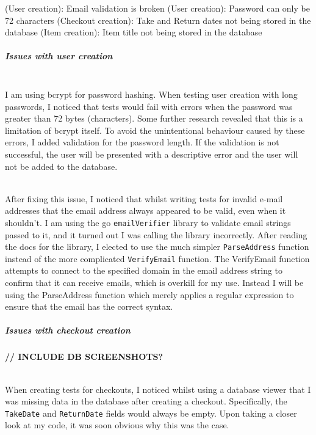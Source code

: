\documentclass[../../main.tex]{subfiles}
\begin{document}
\begin{outline}
    \1 (User creation): Email validation is broken
    \1 (User creation): Password can only be 72 characters
    \1 (Checkout creation): Take and Return dates not being stored in the database
    \1 (Item creation): Item title not being stored in the database
\end{outline}




\subparagraph{Issues with user creation}

\noindent \\ I am using bcrypt for password hashing. When testing user creation with long passwords, I noticed that tests would fail with errors when the password was greater than 72 bytes (characters).
Some further research revealed that this is a limitation of bcrypt itself.
To avoid the unintentional behaviour caused by these errors, I added validation for the password length.
If the validation is not successful, the user will be presented with a descriptive error and the user will not be added to the database.

\noindent \\ After fixing this issue, I noticed that whilst writing tests for invalid e-mail addresses that the email address always appeared to be valid, even when it shouldn't.
I am using the go \lstinline{emailVerifier} library to validate email strings passed to it, and it turned out I was calling the library incorrectly.
After reading the docs for the library, I elected to use the much simpler \lstinline{ParseAddress} function instead of the more complicated \lstinline{VerifyEmail} function.
The VerifyEmail function attempts to connect to the specified domain in the email address string to confirm that it can receive emails, which is overkill for my use.
Instead I will be using the ParseAddress function which merely applies a regular expression to ensure that the email has the correct syntax.

\subparagraph{Issues with checkout creation}

\textbf{// INCLUDE DB SCREENSHOTS?}

\noindent \\ When creating tests for checkouts, I noticed whilst using a database viewer that I was missing data in the database after creating a checkout. Specifically, the \lstinline{TakeDate} and \lstinline{ReturnDate} fields would always be empty.
Upon taking a closer look at my code, it was soon obvious why this was the case.
\end{document}
